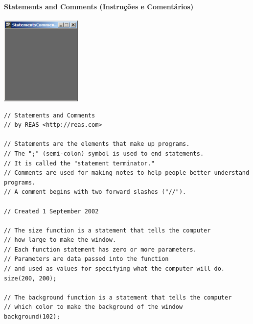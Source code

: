 \paragraph{Statements and Comments (Instruções e Comentários)}
\begin{center}
\includegraphics[width=4cm]{images/exemploStatementsComments.eps}
\end{center}
\begin{lstlisting}
// Statements and Comments
// by REAS <http://reas.com>

// Statements are the elements that make up programs.
// The ";" (semi-colon) symbol is used to end statements. 
// It is called the "statement terminator."
// Comments are used for making notes to help people better understand programs. 
// A comment begins with two forward slashes ("//").

// Created 1 September 2002

// The size function is a statement that tells the computer 
// how large to make the window.
// Each function statement has zero or more parameters. 
// Parameters are data passed into the function
// and used as values for specifying what the computer will do.
size(200, 200);

// The background function is a statement that tells the computer
// which color to make the background of the window 
background(102);
\end{lstlisting}

